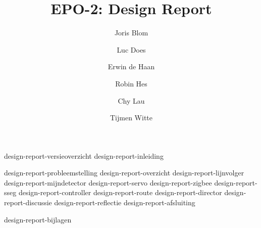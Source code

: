 \documentclass{report}
\title{EPO-2: Design Report}
\author{Joris {Blom} \and Luc {Does} \and Erwin {de Haan} \and Robin {Hes} \and Chy {Lau} \and Tijmen {Witte}}
\begin{document}
\maketitle
\newpage
{}

{design-report-versieoverzicht}
{design-report-inleiding}
\tableofcontents

\newpage
{}

{design-report-probleemstelling}
{design-report-overzicht}
{design-report-lijnvolger}
{design-report-mijndetector}
{design-report-servo}
{design-report-zigbee}
{design-report-sseg}
{design-report-controller}
{design-report-route}
{design-report-director}
{design-report-discussie}
{design-report-reflectie}
{design-report-afsluiting}

\newpage
{}

\printbibliography
{design-report-bijlagen}
\end{document}
